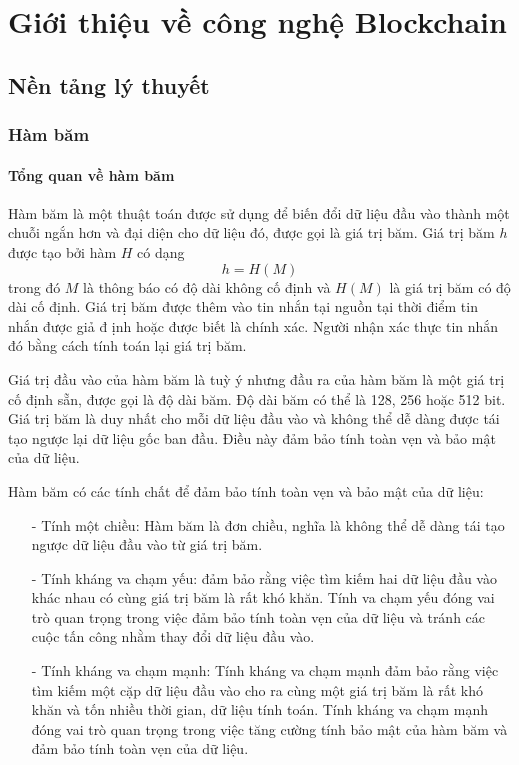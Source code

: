 \chapter{Giới thiệu về công nghệ Blockchain}
\label{chap: blockchain}
\section{Nền tảng lý thuyết}
\subsection{Hàm băm}
\subsubsection{Tổng quan về hàm băm}
Hàm băm là một thuật toán được sử dụng để biến đổi dữ liệu đầu vào thành một chuỗi ngắn hơn và đại diện
cho dữ liệu đó, được gọi là giá trị băm.
Giá trị băm $h$ được tạo bởi hàm $H$ có dạng
$$h = H(M)$$ 
trong đó $M$ là thông báo có độ dài không cố định và $H(M)$ là giá trị băm có độ dài cố 
định. Giá trị băm được thêm vào tin nhắn tại nguồn tại thời điểm tin nhắn được giả đ
ịnh hoặc được biết là chính xác. Người nhận xác thực tin nhắn đó bằng cách tính toán 
lại giá trị băm.\cite{hashfunction}

Giá trị đầu vào của hàm băm là tuỳ ý nhưng đầu ra của hàm băm là một giá trị 
cố định sẵn, được gọi là độ dài băm. Độ dài băm có thể là 128, 256 hoặc 512 bit.
Giá trị băm là duy nhất cho mỗi dữ liệu đầu vào và không thể dễ dàng được tái tạo ngược lại dữ liệu gốc ban đầu. Điều này đảm bảo tính toàn vẹn và 
bảo mật của dữ liệu.


Hàm băm có các tính chất để đảm bảo tính toàn vẹn và bảo mật của dữ liệu:
\begin{itemize}
\item[-] Tính một chiều: Hàm băm là đơn chiều, nghĩa là không thể dễ dàng 
tái tạo ngược dữ liệu đầu vào từ giá trị băm.
\item[-] Tính kháng va chạm yếu: đảm bảo rằng việc tìm kiếm hai dữ liệu đầu vào khác nhau có cùng 
giá trị băm là rất khó khăn. Tính va chạm yếu đóng vai trò quan trọng trong việc đảm bảo tính toàn
vẹn của dữ liệu và tránh các cuộc tấn công nhằm thay đổi dữ liệu đầu vào. 
\item[-] Tính kháng va chạm mạnh:  Tính kháng va chạm mạnh đảm bảo rằng việc tìm kiếm một cặp dữ 
liệu đầu vào cho ra cùng một giá trị băm là rất khó khăn và tốn nhiều thời gian, dữ liệu tính toán.
Tính kháng va chạm mạnh đóng vai trò quan trọng trong việc tăng cường tính bảo mật của hàm băm và 
đảm bảo tính toàn vẹn của dữ liệu.
\item[] 
\end{itemize}

